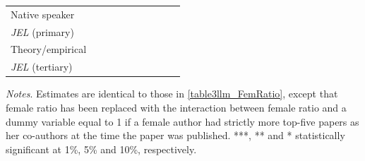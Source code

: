 \begin{table}
\begin{threeparttable}
\begin{tabular}{p{3cm}S@{}S@{}S@{}S@{}S@{}S@{}S@{}S@{}S@{}}
            Native speaker                &               &               &               &               &           {}   &           {}   &           {}   &           {}   &           {}   \\
            \textit{JEL} (primary)        &               &               &               &               &               &               &           {}   &               &               \\
            Theory/empirical              &               &               &               &               &               &               &               &           {}   &               \\
            \textit{JEL} (tertiary)       &               &               &               &               &               &               &               &               &           {}   \\
            \bottomrule
        \end{tabular}
        \begin{tablenotes}
            \tiny
            \item \textit{Notes}. Estimates are identical to those in \autoref{table3llm_FemRatio}, except that female ratio has been replaced with the interaction between female ratio and a dummy variable equal to 1 if a female author had strictly more top-five papers as her co-authors at the time the paper was published. ***, ** and * statistically significant at 1\%, 5\% and 10\%, respectively.
        \end{tablenotes}
    \end{threeparttable}

\end{table}
